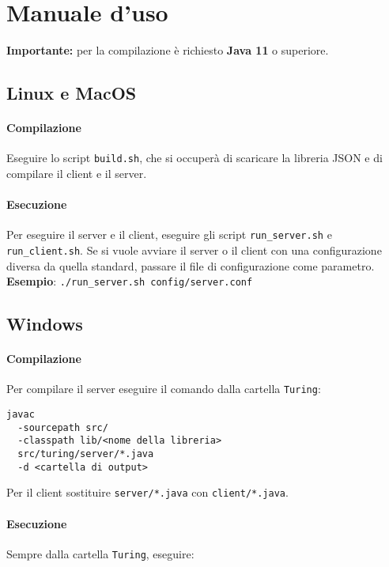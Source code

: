 \section{Manuale d'uso}
\textbf{Importante:} per la compilazione è richiesto \textbf{Java 11} o superiore.

\subsection{Linux e MacOS}

\paragraph{Compilazione}
Eseguire lo script \texttt{build.sh}, che si occuperà di scaricare la libreria JSON e di compilare il client e il server.

\paragraph{Esecuzione}
Per eseguire il server e il client, eseguire gli script \texttt{run\_server.sh} e \texttt{run\_client.sh}. Se si vuole avviare il server o il client con una configurazione diversa da quella standard, passare il file di configurazione come parametro. \\
\textbf{Esempio}: \texttt{./run\_server.sh config/server.conf}

\subsection{Windows}

\paragraph{Compilazione}
Per compilare il server eseguire il comando dalla cartella \texttt{Turing}:

\begin{verbatim}
javac
  -sourcepath src/
  -classpath lib/<nome della libreria>
  src/turing/server/*.java 
  -d <cartella di output>
\end{verbatim}
Per il client sostituire \texttt{server/*.java} con \texttt{client/*.java}.

\paragraph{Esecuzione}
Sempre dalla cartella \texttt{Turing}, eseguire:

